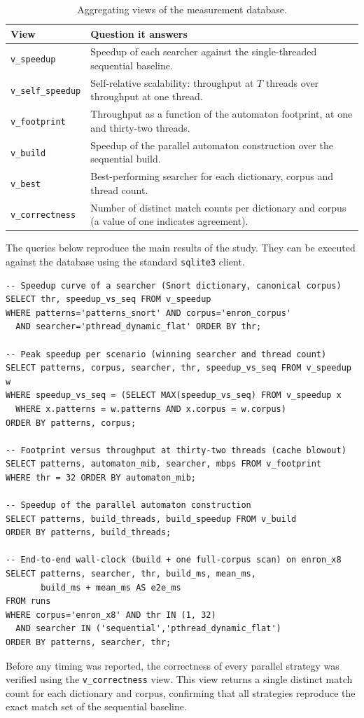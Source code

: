\begin{table}[H]
    \centering
    \caption{Aggregating views of the measurement database.}
    \label{tab:dbviews}
    \small
    \begin{tabular}{@{} l p{8.8cm} @{}}
        \toprule
        \textbf{View} & \textbf{Question it answers} \\
        \midrule
        \texttt{v\_speedup}       & Speedup of each searcher against the single-threaded sequential baseline. \\ \addlinespace
        \texttt{v\_self\_speedup} & Self-relative scalability: throughput at $T$ threads over throughput at one thread. \\ \addlinespace
        \texttt{v\_footprint}     & Throughput as a function of the automaton footprint, at one and thirty-two threads. \\ \addlinespace
        \texttt{v\_build}         & Speedup of the parallel automaton construction over the sequential build. \\ \addlinespace
        \texttt{v\_best}          & Best-performing searcher for each dictionary, corpus and thread count. \\ \addlinespace
        \texttt{v\_correctness}   & Number of distinct match counts per dictionary and corpus (a value of one indicates agreement). \\
        \bottomrule
    \end{tabular}

\end{table}


The queries below reproduce the main results of the study. They can be executed
against the database using the standard \texttt{sqlite3} client.

\begin{verbatim}
-- Speedup curve of a searcher (Snort dictionary, canonical corpus)
SELECT thr, speedup_vs_seq FROM v_speedup
WHERE patterns='patterns_snort' AND corpus='enron_corpus'
  AND searcher='pthread_dynamic_flat' ORDER BY thr;

-- Peak speedup per scenario (winning searcher and thread count)
SELECT patterns, corpus, searcher, thr, speedup_vs_seq FROM v_speedup w
WHERE speedup_vs_seq = (SELECT MAX(speedup_vs_seq) FROM v_speedup x
  WHERE x.patterns = w.patterns AND x.corpus = w.corpus)
ORDER BY patterns, corpus;

-- Footprint versus throughput at thirty-two threads (cache blowout)
SELECT patterns, automaton_mib, searcher, mbps FROM v_footprint
WHERE thr = 32 ORDER BY automaton_mib;

-- Speedup of the parallel automaton construction
SELECT patterns, build_threads, build_speedup FROM v_build
ORDER BY patterns, build_threads;

-- End-to-end wall-clock (build + one full-corpus scan) on enron_x8
SELECT patterns, searcher, thr, build_ms, mean_ms,
       build_ms + mean_ms AS e2e_ms
FROM runs
WHERE corpus='enron_x8' AND thr IN (1, 32)
  AND searcher IN ('sequential','pthread_dynamic_flat')
ORDER BY patterns, searcher, thr;
\end{verbatim}

Before any timing was reported, the correctness of every parallel strategy was
verified using the \texttt{v\_correctness} view. This view returns a single
distinct match count for each dictionary and corpus, confirming that all
strategies reproduce the exact match set of the sequential baseline.
